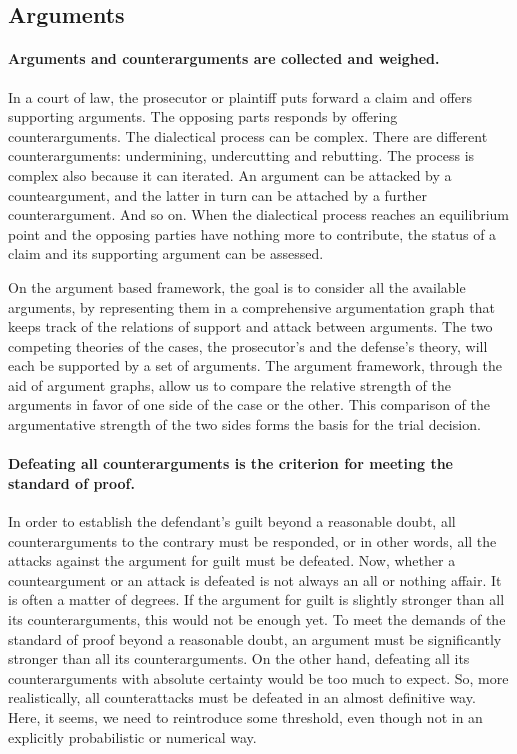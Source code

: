 \documentclass[10pt]{article}
\begin{document}
\subsection{Arguments}


\paragraph{Arguments and counterarguments are collected and weighed.}

In a court of law, the prosecutor or plaintiff puts forward a claim and offers supporting arguments. The opposing parts responds by offering counterarguments. The dialectical process can be complex. There are different counterarguments: undermining,  undercutting and rebutting. The process is complex also because it can iterated. 
An argument can be attacked by a counteargument, and the latter in turn can be attached by a further counterargument. And so on. 
When the dialectical process reaches an equilibrium point and the opposing parties have nothing more to contribute, 
the status of a claim and its supporting argument can be assessed. 

On the argument based 
framework, the goal is to consider all the available arguments, by representing them in a comprehensive argumentation graph that 
keeps track of the relations of support and attack between arguments. The two competing theories of the cases, the prosecutor's and the defense's theory, will each
be supported by a set of arguments. The argument framework, through the aid of argument graphs, allow us to 
compare the relative strength of the arguments in favor of one side of the case or the other. This comparison of the argumentative strength of the two sides 
forms the basis for the trial decision.


\paragraph{Defeating all counterarguments is the criterion for meeting the standard of proof.}

In order to establish the defendant's guilt beyond a reasonable doubt, all counterarguments 
to the contrary must be responded, or in other words, all the attacks against the argument for guilt must be 
defeated. Now, whether a counteargument or an attack is defeated 
is not always an all or nothing affair. It is often a matter of degrees. 
If the argument for guilt is slightly stronger than all its counterarguments, this would not be enough yet. 
To meet the demands of the standard of proof beyond a reasonable doubt, an argument must be significantly 
stronger than all its counterarguments. On the other hand, defeating all its counterarguments with absolute certainty would be too much to expect. 
So, more realistically, all counterattacks must be defeated in an almost definitive way. Here, it seems, we need 
to reintroduce some threshold, even though not in an explicitly probabilistic or numerical way. 
\end{document}
